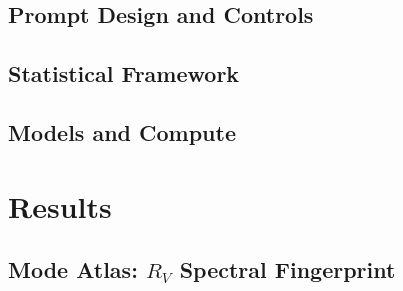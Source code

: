 \documentclass{article}
\newcommand{\RV}{R_V}
\begin{document}

\subsection{Prompt Design and Controls}


\subsection{Statistical Framework}


\subsection{Models and Compute}




\section{Results}

\subsection{Mode Atlas: $\RV$ Spectral Fingerprint}


\end{document}
